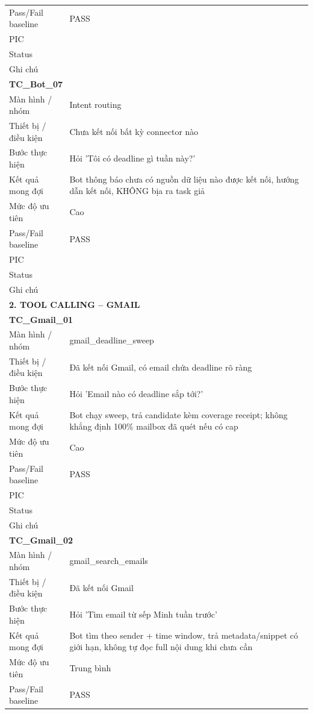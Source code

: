 \documentclass[12pt,a4paper]{article}
\begin{document}
\begin{longtable}{p{3.0cm}p{11.5cm}}
Pass/Fail baseline & PASS \\
PIC &  \\
Status &  \\
Ghi chú &  \\
\midrule
\multicolumn{2}{l}{\textbf{TC\_Bot\_07}} \\
Màn hình / nhóm & Intent routing \\
Thiết bị / điều kiện & Chưa kết nối bất kỳ connector nào \\
Bước thực hiện & Hỏi 'Tôi có deadline gì tuần này?' \\
Kết quả mong đợi & Bot thông báo chưa có nguồn dữ liệu nào được kết nối, hướng dẫn kết nối, KHÔNG bịa ra task giả \\
Mức độ ưu tiên & Cao \\
Pass/Fail baseline & PASS \\
PIC &  \\
Status &  \\
Ghi chú &  \\
\midrule
\multicolumn{2}{l}{\textbf{2. TOOL CALLING – GMAIL}} \\ \midrule
\multicolumn{2}{l}{\textbf{TC\_Gmail\_01}} \\
Màn hình / nhóm & gmail\_deadline\_sweep \\
Thiết bị / điều kiện & Đã kết nối Gmail, có email chứa deadline rõ ràng \\
Bước thực hiện & Hỏi 'Email nào có deadline sắp tới?' \\
Kết quả mong đợi & Bot chạy sweep, trả candidate kèm coverage receipt; không khẳng định 100\% mailbox đã quét nếu có cap \\
Mức độ ưu tiên & Cao \\
Pass/Fail baseline & PASS \\
PIC &  \\
Status &  \\
Ghi chú &  \\
\midrule
\multicolumn{2}{l}{\textbf{TC\_Gmail\_02}} \\
Màn hình / nhóm & gmail\_search\_emails \\
Thiết bị / điều kiện & Đã kết nối Gmail \\
Bước thực hiện & Hỏi 'Tìm email từ sếp Minh tuần trước' \\
Kết quả mong đợi & Bot tìm theo sender + time window, trả metadata/snippet có giới hạn, không tự đọc full nội dung khi chưa cần \\
Mức độ ưu tiên & Trung bình \\
Pass/Fail baseline & PASS \\

\end{longtable}
\end{document}
